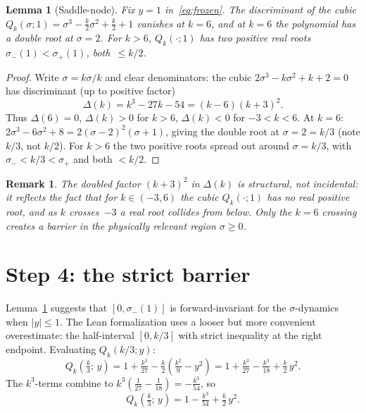 \documentclass[11pt]{article}
\newtheorem{lemma}[theorem]{Lemma}
\newtheorem{remark}[theorem]{Remark}
\begin{document}
\begin{lemma}[Saddle-node]\label{lem:SN}
Fix $y = 1$ in~\eqref{eq:frozen}.  The discriminant of the cubic
$Q_{k}(\sigma; 1) = \sigma^{3} - \tfrac{k}{2}\sigma^{2} + \tfrac{k}{2} + 1$
vanishes at $k = 6$, and at $k = 6$ the polynomial has a double root at
$\sigma = 2$.  For $k > 6$, $Q_{k}(\cdot; 1)$ has two positive real roots
$\sigma_{-}(1) < \sigma_{+}(1)$, both~$\le k/2$.
\end{lemma}

\begin{proof}
Write $\sigma = k\sigma / k$ and clear denominators: the cubic
$2\sigma^{3} - k \sigma^{2} + k + 2 = 0$ has discriminant (up to positive
factor)
\[
  \Delta(k) = k^{3} - 27 k - 54 = (k - 6)(k + 3)^{2}.
\]
Thus $\Delta(6) = 0$, $\Delta(k) > 0$ for $k > 6$, $\Delta(k) < 0$ for
$-3 < k < 6$.  At $k = 6$: $2\sigma^{3} - 6\sigma^{2} + 8 = 2(\sigma - 2)^{2}(\sigma + 1)$,
giving the double root at $\sigma = 2 = k/3$ (note $k/3$, not $k/2$).  For
$k > 6$ the two positive roots spread out around $\sigma = k/3$, with
$\sigma_{-} < k/3 < \sigma_{+}$ and both $< k/2$.
\end{proof}

\begin{remark}\label{rem:double}
The doubled factor $(k + 3)^{2}$ in $\Delta(k)$ is structural, not incidental:
it reflects the fact that for $k \in (-3, 6)$ the cubic $Q_{k}(\cdot; 1)$ has
no real positive root, and as $k$ crosses~$-3$ a real root collides from below.
Only the $k = 6$ crossing creates a barrier in the physically relevant region
$\sigma \ge 0$.
\end{remark}

\section{Step 4: the strict barrier}\label{sec:barrier}

Lemma~\ref{lem:SN} suggests that $[0, \sigma_{-}(1)]$ is forward-invariant for
the $\sigma$-dynamics when $|y| \le 1$.  The Lean formalization uses a looser
but more convenient overestimate: the half-interval $[0, k/3]$ with strict
inequality at the right endpoint.  Evaluating $Q_{k}(k/3; y)$:
\[
  Q_{k}\!\left(\tfrac{k}{3};\, y\right)
  = 1 + \tfrac{k^{3}}{27} - \tfrac{k}{2}\left(\tfrac{k^{2}}{9} - y^{2}\right)
  = 1 + \tfrac{k^{3}}{27} - \tfrac{k^{3}}{18} + \tfrac{k}{2}\, y^{2}.
\]
The $k^{3}$-terms combine to $k^{3}\!\left(\tfrac{1}{27} - \tfrac{1}{18}\right)
= -\tfrac{k^{3}}{54}$, so
\begin{equation}\label{eq:Qk3}
  Q_{k}\!\left(\tfrac{k}{3};\, y\right)
  = 1 - \tfrac{k^{3}}{54} + \tfrac{k}{2}\, y^{2}.
\end{equation}
\end{document}
